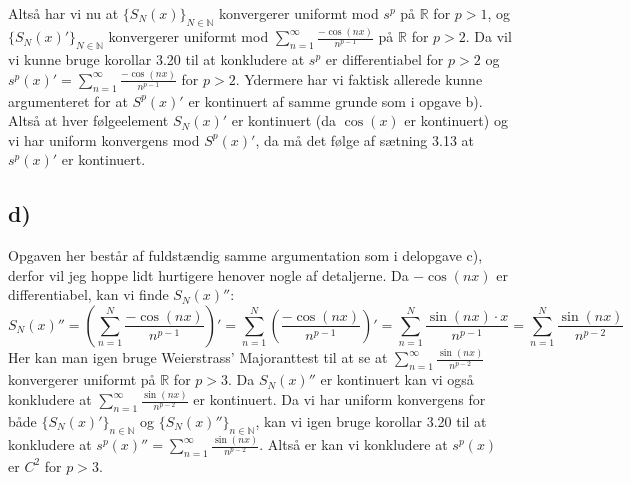 \documentclass{article}
\newcommand{\m}[1]{\mathbb{#1}}
\newcommand{\mR}{\m{R}}
\newcommand{\mN}{\m{N}}
\newcommand{\lr}[1]{\left( #1\right)}
\begin{document}
Altså har vi nu at $\{ S_N(x) \}_{N \in \mN}$ konvergerer uniformt mod $s^p$ på $\mR$ for $p>1$, og
$\{ S_N(x)' \}_{N \in \mN}$ konvergerer uniformt mod $\sum_{n=1}^{\infty} \frac{-\cos(nx)}{n^{p-1}}$ på $\mR$ for $p>2$.
Da vil vi kunne bruge korollar 3.20 til at konkludere at $s^p$ er differentiabel for $p>2$ og
$s^{p}(x)' = \sum_{n=1}^{\infty} \frac{-\cos(nx)}{n^{p-1}}$ for $p>2$. 
Ydermere har vi faktisk allerede kunne argumenteret for at $S^p(x)'$ er kontinuert af samme grunde som i
opgave b). Altså at hver følgeelement $S_N(x)'$ er kontinuert (da $\cos(x)$ er kontinuert) og vi har uniform konvergens mod
$S^p(x)'$, da må det følge af sætning 3.13\cite{an1} at $s^p(x)'$ er kontinuert.

\subsection*{d)}
Opgaven her består af fuldstændig samme argumentation som i delopgave c),
 derfor vil jeg hoppe lidt hurtigere henover nogle af detaljerne.
Da $-\cos(nx)$ er differentiabel, kan vi finde $S_N(x)''$:
\[
    S_N(x)'' = \lr{\sum_{n=1}^{N} \frac{-\cos(nx)}{n^{p-1}}}' 
    = \sum_{n=1}^{N} \lr{\frac{-\cos(nx)}{n^{p-1}}}'
    = \sum_{n=1}^{N} \frac{\sin(nx)\cdot x}{n^{p-1}}
    = \sum_{n=1}^{N} \frac{\sin(nx)}{n^{p-2}}
\]
Her kan man igen bruge Weierstrass' Majoranttest til at se at 
$\sum_{n=1}^{\infty} \frac{\sin(nx)}{n^{p-2}}$ konvergerer uniformt på $\mR$ for $p>3$.
Da $S_N(x)''$ er kontinuert kan vi også konkludere at 
$\sum_{n=1}^{\infty} \frac{\sin(nx)}{n^{p-2}}$ er kontinuert.
Da vi har uniform konvergens for både $\{S_N(x)'\}_{n \in \mN}$ 
og $\{S_N(x)''\}_{n \in \mN}$, kan vi igen bruge korollar 3.20 til at konkludere
at $s^p(x)'' =  \sum_{n=1}^{\infty} \frac{\sin(nx)}{n^{p-2}}$.
Altså er kan vi konkludere at $s^p(x)$ er $C^2$ for $p>3$.









\end{document}
